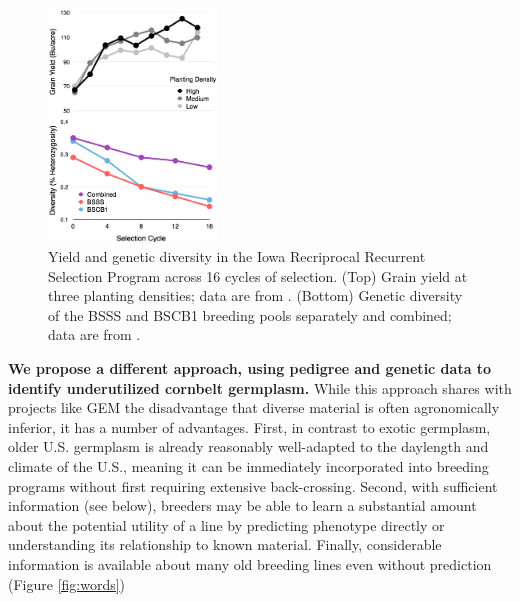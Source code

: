 \documentclass[12pt]{article}
\begin{document}
\begin{figure}
    \includegraphics[width=0.4\textwidth]{BSSS.png}
  \caption{Yield and genetic diversity in the Iowa Recriprocal Recurrent Selection Program across 16 cycles of selection. (Top) Grain yield at three planting densities; data are from \citet{rouse2003selection}. (Bottom) Genetic diversity of the BSSS and BSCB1 breeding pools separately and combined; data are from \citet{Gerke:2013tw}.}
\label{fig:trends}
\end{figure}

\textbf{We propose a different approach, using pedigree and genetic data to identify underutilized cornbelt germplasm.}  
While this approach shares with projects like GEM the disadvantage that diverse material is often  agronomically inferior, it has a number of advantages.  
First, in contrast to exotic germplasm, older U.S. germplasm is already reasonably well-adapted to the daylength and climate of the U.S., meaning it can be immediately incorporated into breeding programs without first requiring extensive back-crossing.
Second, with sufficient information (see below), breeders may be able to learn a substantial amount about the potential utility of a line by predicting phenotype directly or understanding its relationship to known material. 
Finally, considerable information is available about many old breeding lines even without prediction (Figure \ref{fig:words})
\end{document}
